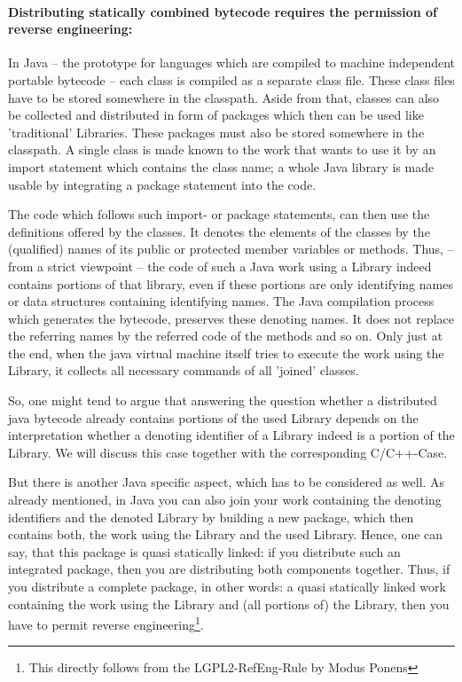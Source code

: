 \paragraph{Distributing statically combined bytecode requires the
permission of reverse engineering:}
\label{RevEngDistributeStaticallyCombinedByteCode}
In Java -- the prototype for languages which are compiled to machine independent
portable bytecode -- each class is compiled as a separate class file. These
class files have to be stored somewhere in the classpath. Aside from that,
classes can also be collected and distributed in form of packages which then can
be used like 'traditional' Libraries. These packages must also be stored
somewhere in the classpath. A single class is made known to the work that wants
to use it by an import statement which contains the class name; a whole Java
library is made usable by integrating a package statement into the code.

The code which follows such import- or package statements, can then use the
definitions offered by the classes. It denotes the elements of the classes by
the (qualified) names of its public or protected member variables or methods.
Thus, -- from a strict viewpoint -- the code of such a Java work using a Library
indeed contains portions of that library, even if these portions are only
identifying names or data structures containing identifying names. The Java
compilation process which generates the bytecode, preserves these denoting
names. It does not replace the referring names by the referred code of the
methods and so on. Only just at the end, when the java virtual machine itself
tries to execute the work using the Library, it collects all necessary commands
of all 'joined' classes.

So, one might tend to argue that answering the question whether a distributed
java bytecode already contains portions of the used Library depends on the
interpretation whether a denoting identifier of a Library indeed is a portion
of the Library. We will discuss this case together with the corresponding
C/C++-Case. 

But there is another Java specific aspect, which has to be considered as well.
As already mentioned, in Java you can also join your work containing the
denoting identifiers and the denoted Library by building a new package, which
then contains both, the work using the Library and the used Library. Hence, one
can say, that this package is quasi statically linked: if you distribute such an
integrated package, then you are distributing both components together. Thus, if
you distribute a complete package, in other words: a quasi statically linked
work containing the work using the Library and (all portions of) the Library,
then you have to permit reverse engineering\footnote{This directly follows from
the LGPL2-RefEng-Rule by Modus Ponens}.

